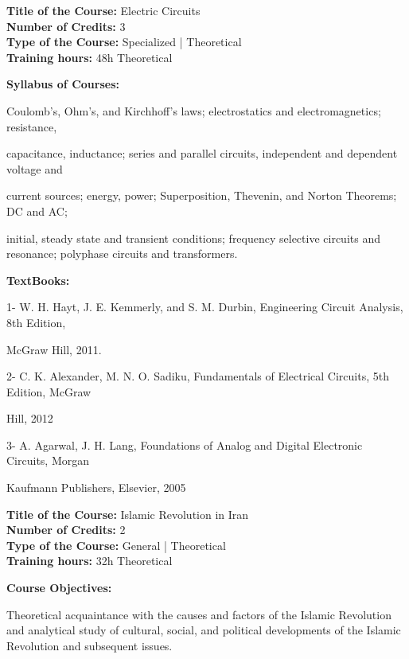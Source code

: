 \documentclass[12pt,a4paper]{article}
\begin{document}
\newpage
\textbf{Title of the Course:} Electric Circuits\\
\textbf{Number of Credits:} 3\\
\textbf{Type of the Course:} Specialized | Theoretical\\
\textbf{Training hours:} 48h Theoretical\par\vspace{4pt}
\textbf{Syllabus of Courses:}\par\vspace{2pt}
Coulomb's, Ohm's, and Kirchhoff’s laws; electrostatics and electromagnetics; resistance,\par
capacitance, inductance; series and parallel circuits, independent and dependent voltage and\par
current sources; energy, power; Superposition, Thevenin, and Norton Theorems; DC and AC;\par
initial, steady state and transient conditions; frequency selective circuits and resonance; polyphase circuits and transformers.\par\vspace{4pt}
\textbf{TextBooks:}\par\vspace{2pt}
1- W. H. Hayt, J. E. Kemmerly, and S. M. Durbin, Engineering Circuit Analysis, 8th Edition,\par
McGraw Hill, 2011.\par
2- C. K. Alexander, M. N. O. Sadiku, Fundamentals of Electrical Circuits, 5th Edition, McGraw\par
Hill, 2012\par
3- A. Agarwal, J. H. Lang, Foundations of Analog and Digital Electronic Circuits, Morgan\par
Kaufmann Publishers, Elsevier, 2005\par
\vspace{4pt}

\newpage
\nopagebreak
\textbf{Title of the Course:} Islamic Revolution in Iran\\
\textbf{Number of Credits:} 2\\
\textbf{Type of the Course:} General | Theoretical\\
\textbf{Training hours:} 32h Theoretical\par\vspace{4pt}
\textbf{Course Objectives:}\par\vspace{2pt}
Theoretical acquaintance with the causes and factors of the Islamic Revolution and analytical study
of cultural, social, and political developments of the Islamic Revolution and subsequent issues.\par\vspace{4pt}
\end{document}
